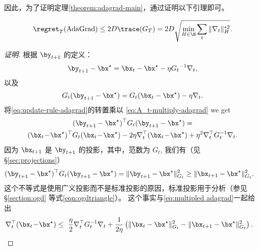 因此，为了证明定理\ref{theorem:adagrad-main}，通过证明以下引理即可。
\begin{lemma}
$$ \regret_T(\text{AdaGrad}) \leq 2  D \trace(G_T) = 2D  \sqrt{  \min_{H \in \H} \sum_t \|\nabla_t \|_H^{* 2} }  .$$
\end{lemma}
\begin{proof}[证明]
根据 $\by_{t+1}$ 的定义：
\begin{equation} \label{eq:update-rule-adagrad}
\by_{t+1} - \bx^\star = \bx_{t} - \bx^\star - \eta {G_t}^{-1}
\nabla_t,
\end{equation}
以及
\begin{equation} \label{eq:A_t-multiply-adagrad}
G_t (\by_{t+1} - \bx^\star) = G_t (\bx_t - \bx^\star) - \eta 
\nabla_t.
\end{equation}
将\eqref{eq:update-rule-adagrad}的转置乘以
\eqref{eq:A_t-multiply-adagrad} we get
\begin{gather}
(\by_{t+1} - \bx^\star)^\top G_t(\by_{t+1} - \bx^\star) = \notag \\
(\bx_t\! -\! \bx^\star)^\top G_t(\bx_t\! -\! \bx^\star) -
2 \eta  \nabla_t^\top (\bx_t\! -\! \bx^\star) +
\eta^2 \nabla_t^\top G_t^{-1} \nabla_t.
\label{eq:multiplied-adagrad}
\end{gather}
因为 $\bx_{t+1}$ 是 $\by_{t+1}$ 的投影，其中，范数为
$G_t$,
我们有（见 \S \ref{sec:projections}）
\begin{align*}
 (\by_{t+1} - \bx^\star)^\top G_t(\by_{t+1} - \bx^\star)  & = \| \by_{t+1} - \bx^\star \|_{G_t}^2  \ge  \| \bx_{t+1} - \bx^\star \|_{G_t}^2   .
\end{align*}
这个不等式是使用广义投影而不是标准投影的原因，标准投影用于分析\ogd（参见\S\ref{section:ogd} 等式\eqref{eqn:ogdtriangle}）。
这个事实与\eqref{eq:multipled adagrad}一起给出
\begin{align*}
\nabla_t^\top (\bx_t \! -\! \bx^\star) &\leq \ \frac{\eta}{2}
\nabla_t^\top G_t^{-1} \nabla_t  +  \frac{1}{2 \eta} \left( \| \bx_{t} - \bx^\star \|_{G_t}^2 - \| \bx_{t+1} - \bx^\star \|_{G_{t}}^2  \right) .

\end{align*}
\end{proof}
